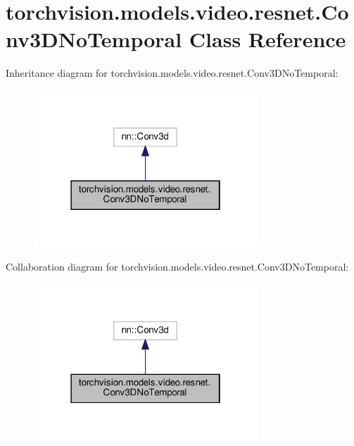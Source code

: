 \hypertarget{classtorchvision_1_1models_1_1video_1_1resnet_1_1Conv3DNoTemporal}{}\section{torchvision.\+models.\+video.\+resnet.\+Conv3\+D\+No\+Temporal Class Reference}
\label{classtorchvision_1_1models_1_1video_1_1resnet_1_1Conv3DNoTemporal}


Inheritance diagram for torchvision.\+models.\+video.\+resnet.\+Conv3\+D\+No\+Temporal\+:
\nopagebreak
\begin{figure}[H]
\begin{center}
\leavevmode
\includegraphics[width=238pt]{classtorchvision_1_1models_1_1video_1_1resnet_1_1Conv3DNoTemporal__inherit__graph}
\end{center}
\end{figure}


Collaboration diagram for torchvision.\+models.\+video.\+resnet.\+Conv3\+D\+No\+Temporal\+:
\nopagebreak
\begin{figure}[H]
\begin{center}
\leavevmode
\includegraphics[width=238pt]{classtorchvision_1_1models_1_1video_1_1resnet_1_1Conv3DNoTemporal__coll__graph}
\end{center}
\end{figure}
